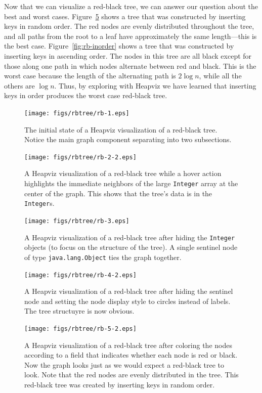 Now that we can visualize a red-black tree, we can answer our question about
the best and worst cases.  Figure~\ref{fig:rb-5-2} shows a tree that was 
constructed by inserting keys in random order.  The red nodes are evenly 
distributed throughout the tree, and all paths from the root to a leaf
have approximately the same length---this is the best case. 
Figure~\ref{fig:rb-inorder} shows a tree that was constructed by inserting keys
in ascending order. The nodes in this tree are all black except for those along
one path in which nodes alternate between red and black. This is the worst 
case because the length of the alternating path is $2 \log n$, while all
the others are $\log n$.  Thus, by exploring with Heapviz we have learned 
that inserting keys in order produces the worst case red-black tree.

\begin{figure}
  \texttt{[image: figs/rbtree/rb-1.eps]}
  \caption{The initial state of a Heapviz visualization of a red-black tree.
  Notice the main graph component separating into two subsections.}
  \label{fig:rb-1}
\end{figure}

\begin{figure}
  \texttt{[image: figs/rbtree/rb-2-2.eps]}
  \caption{A Heapviz visualization of a red-black tree while a hover action
  highlights the immediate neighbors of the large \texttt{Integer} array
  at the center of the graph. This shows that the tree's data is in the
  \texttt{Integer}s.}
  \label{fig:rb-2-2}
\end{figure}

\begin{figure}
  \texttt{[image: figs/rbtree/rb-3.eps]}
  \caption{A Heapviz visualization of a red-black tree after hiding the
  \texttt{Integer} objects (to focus on the structure of the tree). A single
  sentinel node of type \texttt{java.lang.Object} ties the graph together.}
  \label{fig:rb-3}
\end{figure}

\begin{figure}
  \texttt{[image: figs/rbtree/rb-4-2.eps]}
  \caption{A Heapviz visualization of a red-black tree after hiding the
  sentinel node and setting the node display style to circles instead of
  labels. The tree structuyre is now obvious.}
  \label{fig:rb-4-2}
\end{figure}

\begin{figure}
  \texttt{[image: figs/rbtree/rb-5-2.eps]}
  \caption{A Heapviz visualization of a red-black tree after coloring the
  nodes according to a field that indicates whether each node is red or
  black. Now the graph looks just as we would expect a red-black tree
  to look. Note that the red nodes are evenly distributed in the tree.
  This red-black tree was created by inserting keys in random order.}
  \label{fig:rb-5-2}
\end{figure}

